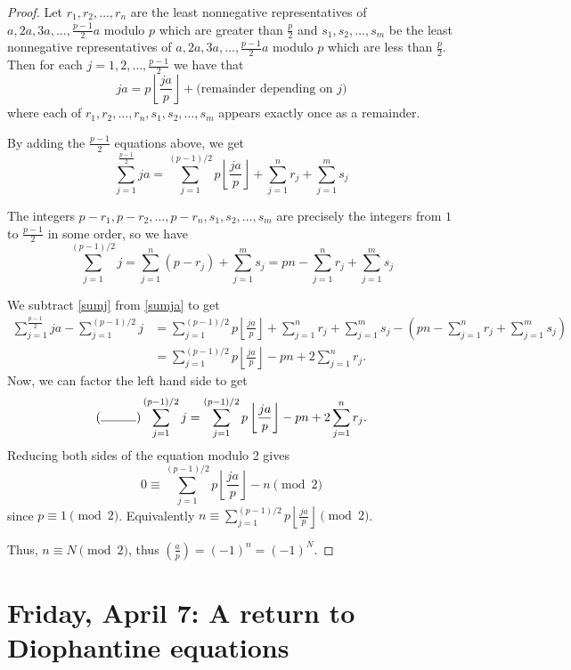 \documentclass[letterpaper, 11 pt]{article}
\begin{document}
\begin{proof}
 Let $r_1,r_2,\dots,r_n$ are the least nonnegative representatives of $a,2a,3a,\dots,\frac{p-1}{2}a$ modulo $p$ which are greater than $\frac{p}{2}$ and $s_1,s_2,\dots,s_m$ be the least nonnegative representatives of $a,2a,3a,\dots,\frac{p-1}{2}a$ modulo $p$ which are less than $\frac{p}{2}$.  Then for each $j=1,2, \dots, \frac{p-1}{2}$ we have that \[ja=p\left\lfloor\frac{ja}{p}\right\rfloor+\textrm{(remainder depending on $j$)}\]
 where each of $r_1,r_2, \dots, r_n,s_1,s_2,\dots,s_m$ appears exactly once as a remainder. 
 
By adding the $\frac{p-1}{2}$ equations above, we get
\begin{equation}\label{sumja}\sum_{j=1}^{\frac{p-1}{2} }ja=\sum_{j=1}^{(p-1)/2}p\left\lfloor\frac{ja}{p}\right\rfloor+\sum_{j=1}^n r_j+\sum_{j=1}^m s_j
\end{equation}

The integers $p-r_1,p-r_2,\dots,p-r_n,s_1,s_2,\dots,s_m$ are precisely the integers from $1$ to $\frac{p-1}{2}$ in some order, so we have 
\begin{equation}\label{sumj}
 \sum_{j=1}^{(p-1)/2} j=\sum_{j=1}^n (p-r_j)+\sum_{j=1}^m s_j=pn-\sum_{j=1}^n r_j+\sum_{j=1}^m s_j
\end{equation}

We subtract \eqref{sumj} from \eqref{sumja} to get 
\begin{align*}
 \sum_{j=1}^{\frac{p-1}{2} }ja- \sum_{j=1}^{(p-1)/2} j&=\sum_{j=1}^{(p-1)/2}p\left\lfloor\frac{ja}{p}\right\rfloor+\sum_{j=1}^n r_j+\sum_{j=1}^m s_j -\left( pn-\sum_{j=1}^n r_j+\sum_{j=1}^m s_j \right)\\
 &=\sum_{j=1}^{(p-1)/2}p\left\lfloor\frac{ja}{p}\right\rfloor -pn +2\sum_{j=1}^n r_j.
\end{align*}
Now, we can factor the left hand side to get 
\[( \rule{1cm}{.4pt}
)\sum_{j=1}^{(p-1)/2} j=\sum_{j=1}^{(p-1)/2}p\left\lfloor\frac{ja}{p}\right\rfloor -pn +2\sum_{j=1}^n r_j.\]
Reducing both sides of the equation modulo 2 gives
\[0\equiv \sum_{j=1}^{(p-1)/2}p\left\lfloor\frac{ja}{p}\right\rfloor -n \pmod 2\] since $p\equiv  {1}
\pmod 2$. Equivalently $n\equiv \sum_{j=1}^{(p-1)/2}p\left\lfloor\frac{ja}{p}\right\rfloor\pmod 2$.

Thus, $n\equiv N \pmod 2$, thus $\left(\frac{a}{p}\right)=(-1)^n=(-1)^N$.

\end{proof}
\section{Friday, April 7: A return to Diophantine equations}
\end{document}
